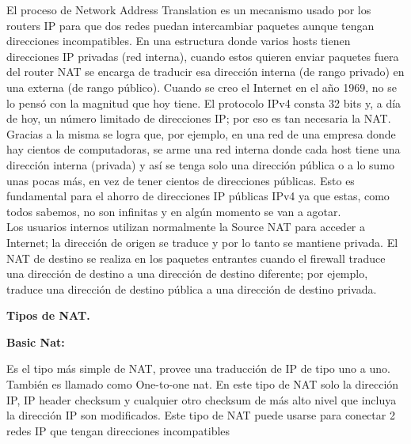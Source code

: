 \documentclass{article}
\begin{document}
El proceso de Network Address Translation es un mecanismo usado por los routers IP para que dos redes puedan intercambiar paquetes aunque tengan direcciones incompatibles.
En una estructura donde varios hosts tienen direcciones IP privadas (red interna), cuando estos quieren enviar paquetes fuera del router NAT se encarga de traducir esa dirección interna (de rango privado) en una externa (de rango público).
Cuando se creo el Internet en el año 1969, no se lo pensó con la magnitud que hoy tiene.
El protocolo IPv4 consta 32 bits y, a día de hoy, un número limitado de direcciones IP; por eso es tan necesaria la NAT. Gracias a la misma se logra que, por ejemplo, en una red de una empresa donde hay cientos de computadoras, se arme una red interna donde cada host tiene una dirección interna (privada) y así se tenga solo una dirección pública o a lo sumo unas pocas más, en vez de tener cientos de direcciones públicas. Esto es fundamental para el ahorro de direcciones IP públicas IPv4 ya que estas, como todos sabemos, no son infinitas y en algún momento se van a agotar.\\
Los usuarios internos utilizan normalmente la Source NAT para acceder a Internet; la dirección de origen se traduce y por lo tanto se mantiene privada.
El NAT de destino se realiza en los paquetes entrantes cuando el firewall traduce una dirección de destino a una dirección de destino diferente; por ejemplo, traduce una dirección de destino pública a una dirección de destino privada.

\vspace{\baselineskip}
\begin{center}
	{\fontsize{14pt}{16.8pt}\selectfont \textbf{Tipos de NAT.}\par}
\end{center}\par


\vspace{\baselineskip}
\textbf{Basic Nat:}\par

Es el tipo más simple de NAT, provee una traducción de IP de tipo uno a uno. También es llamado como One-to-one nat. En este tipo de NAT solo la dirección IP, IP header checksum y cualquier otro checksum de más alto nivel que incluya la dirección IP son modificados. Este tipo de NAT puede usarse para conectar 2 redes IP que tengan direcciones incompatibles\par


\vspace{\baselineskip}
\end{document}
